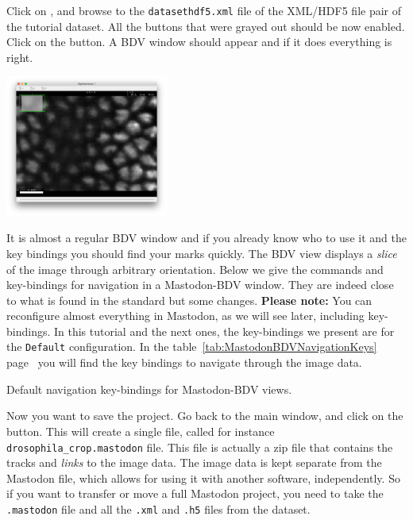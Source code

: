 Click on , and browse to the \texttt{datasethdf5.xml} file of the XML/HDF5 file pair of the tutorial dataset.
All the buttons that were grayed out should be now enabled. 
Click on the  button.
A BDV window should appear and if it does everything is right.
\begin{center}
         \includegraphics[width=0.4\textwidth]{figures/Mastodon_BDV.png}
\end{center}

It is almost a regular BDV window and if you already know who to use it and the key bindings you should find your marks quickly.
The BDV view displays a \textit{slice} of the image through arbitrary orientation. 
Below we give the commands and key-bindings for navigation in a Mastodon-BDV window. 
They are indeed close to what is found in the standard \Bdv but some changes. 
\textbf{Please note:} You can reconfigure almost everything in Mastodon, as we will see later, including key-bindings.
In this tutorial and the next ones, the key-bindings we present are for the \texttt{Default} configuration.
In the table~\ref{tab:MastodonBDVNavigationKeys} page~\pageref{tab:MastodonBDVNavigationKeys} you will find the key bindings to navigate through the image data.

\begin{table}[!htbp]
    \centering
    
    \caption{Default navigation key-bindings for Mastodon-BDV views.}

    

    \label{tab:MastodonBDVNavigationKeys}
    \vspace{-10pt}

\end{table}

Now you want to save the project. 
Go back to the main window, and click on the  button.
This will create a single file, called for instance \texttt{drosophila\_crop.mastodon} file. 
This file is actually a zip file that contains the tracks and \textit{links} to the image data.
The image data is kept separate from the Mastodon file, which allows for using it with another software, independently. 
So if you want to transfer or move a full Mastodon project, you need to take the \texttt{.mastodon} file and all the \texttt{.xml} and \texttt{.h5} files from the \Bdv dataset.

